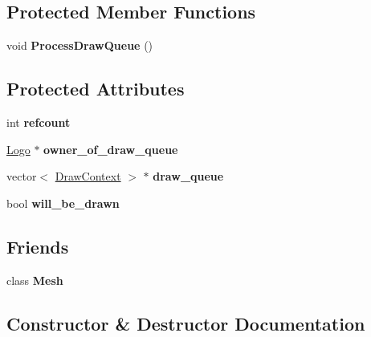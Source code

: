 \subsection*{Protected Member Functions}
\begin{DoxyCompactItemize}
\item 
void {\bfseries Process\+Draw\+Queue} ()\hypertarget{classLogo_a049e5e2107db5f7a436441757bf133de}{}\label{classLogo_a049e5e2107db5f7a436441757bf133de}

\end{DoxyCompactItemize}
\subsection*{Protected Attributes}
\begin{DoxyCompactItemize}
\item 
int {\bfseries refcount}\hypertarget{classLogo_a375e8bc920202f78d3681baa62e419bc}{}\label{classLogo_a375e8bc920202f78d3681baa62e419bc}

\item 
\hyperlink{classLogo}{Logo} $\ast$ {\bfseries owner\+\_\+of\+\_\+draw\+\_\+queue}\hypertarget{classLogo_ac88ccaff099d690ef5105a943246bed2}{}\label{classLogo_ac88ccaff099d690ef5105a943246bed2}

\item 
vector$<$ \hyperlink{structDrawContext}{Draw\+Context} $>$ $\ast$ {\bfseries draw\+\_\+queue}\hypertarget{classLogo_aa8ea3c290d484c5c0b628128908e021e}{}\label{classLogo_aa8ea3c290d484c5c0b628128908e021e}

\item 
bool {\bfseries will\+\_\+be\+\_\+drawn}\hypertarget{classLogo_ad58f36e06abec9e25aeccb5747c07aa2}{}\label{classLogo_ad58f36e06abec9e25aeccb5747c07aa2}

\end{DoxyCompactItemize}
\subsection*{Friends}
\begin{DoxyCompactItemize}
\item 
class {\bfseries Mesh}\hypertarget{classLogo_aa41a130f156b145bffb3f4b5172c4c93}{}\label{classLogo_aa41a130f156b145bffb3f4b5172c4c93}

\end{DoxyCompactItemize}


\subsection{Constructor \& Destructor Documentation}
